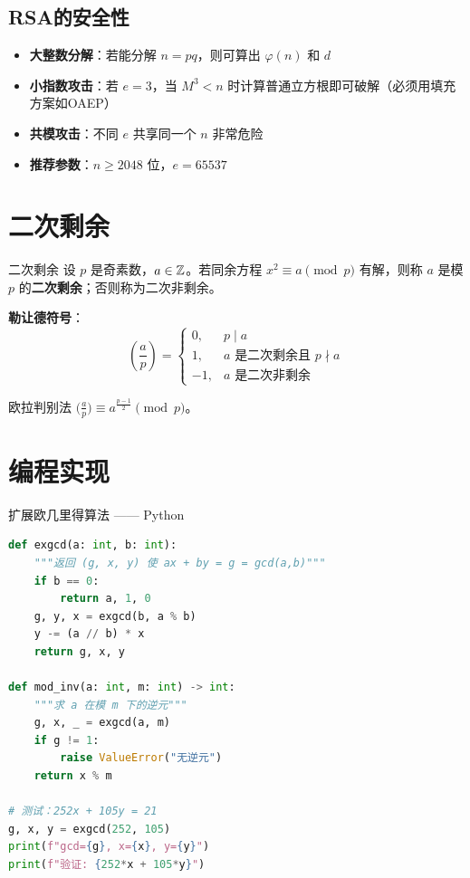 \subsection{RSA的安全性}

\begin{itemize}
    \item \textbf{大整数分解}：若能分解 \(n=pq\)，则可算出 \(\varphi(n)\) 和 \(d\)
    \item \textbf{小指数攻击}：若 \(e=3\)，当 \(M^3<n\) 时计算普通立方根即可破解（必须用填充方案如OAEP）
    \item \textbf{共模攻击}：不同 \(e\) 共享同一个 \(n\) 非常危险
    \item \textbf{推荐参数}：\(n\geqslant 2048\) 位，\(e=65537\)
\end{itemize}

\section{二次剩余}

\begin{mydefinition}{二次剩余}
设 \(p\) 是奇素数，\(a\in\mathbb{Z}\)。若同余方程 \(x^2\equiv a\pmod{p}\) 有解，则称 \(a\) 是模 \(p\) 的\textbf{二次剩余}；否则称为二次非剩余。
\end{mydefinition}

\textbf{勒让德符号}：
\[
\left(\frac{a}{p}\right) = \begin{cases}
0, & p\mid a \\
1, & a\text{ 是二次剩余且 }p\nmid a \\
-1, & a\text{ 是二次非剩余}
\end{cases}
\]

\begin{myTheorem}{欧拉判别法}
\(\bigl(\frac{a}{p}\bigr) \equiv a^{\frac{p-1}{2}} \pmod{p}\)。
\end{myTheorem}

\section{编程实现}

\begin{mycode}{扩展欧几里得算法 —— Python}
\begin{lstlisting}[language=Python]
def exgcd(a: int, b: int):
    """返回 (g, x, y) 使 ax + by = g = gcd(a,b)"""
    if b == 0:
        return a, 1, 0
    g, y, x = exgcd(b, a % b)
    y -= (a // b) * x
    return g, x, y

def mod_inv(a: int, m: int) -> int:
    """求 a 在模 m 下的逆元"""
    g, x, _ = exgcd(a, m)
    if g != 1:
        raise ValueError("无逆元")
    return x % m

# 测试：252x + 105y = 21
g, x, y = exgcd(252, 105)
print(f"gcd={g}, x={x}, y={y}")
print(f"验证: {252*x + 105*y}")
\end{lstlisting}
\end{mycode}

